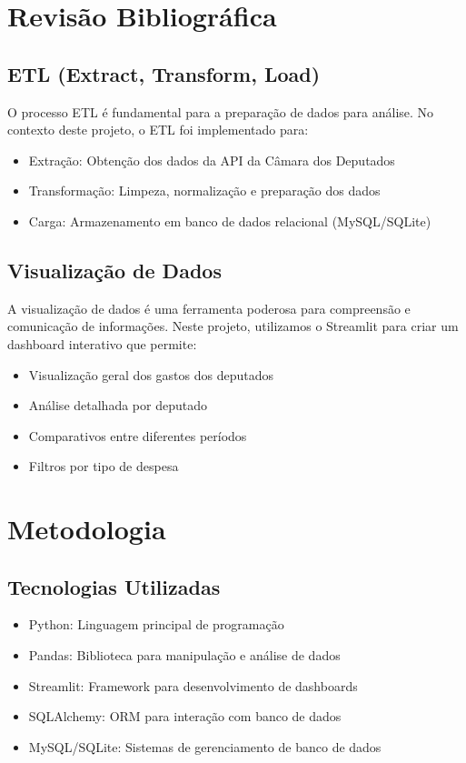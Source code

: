 \documentclass[12pt,a4paper]{article}
\begin{document}
\section{Revisão Bibliográfica}
\subsection{ETL (Extract, Transform, Load)}
O processo ETL é fundamental para a preparação de dados para análise. No contexto deste projeto, o ETL foi implementado para:
\begin{itemize}
    \item Extração: Obtenção dos dados da API da Câmara dos Deputados
    \item Transformação: Limpeza, normalização e preparação dos dados
    \item Carga: Armazenamento em banco de dados relacional (MySQL/SQLite)
\end{itemize}

\subsection{Visualização de Dados}
A visualização de dados é uma ferramenta poderosa para compreensão e comunicação de informações. Neste projeto, utilizamos o Streamlit para criar um dashboard interativo que permite:
\begin{itemize}
    \item Visualização geral dos gastos dos deputados
    \item Análise detalhada por deputado
    \item Comparativos entre diferentes períodos
    \item Filtros por tipo de despesa
\end{itemize}

\section{Metodologia}
\subsection{Tecnologias Utilizadas}
\begin{itemize}
    \item Python: Linguagem principal de programação
    \item Pandas: Biblioteca para manipulação e análise de dados
    \item Streamlit: Framework para desenvolvimento de dashboards
    \item SQLAlchemy: ORM para interação com banco de dados
    \item MySQL/SQLite: Sistemas de gerenciamento de banco de dados
\end{itemize}
\end{document}
